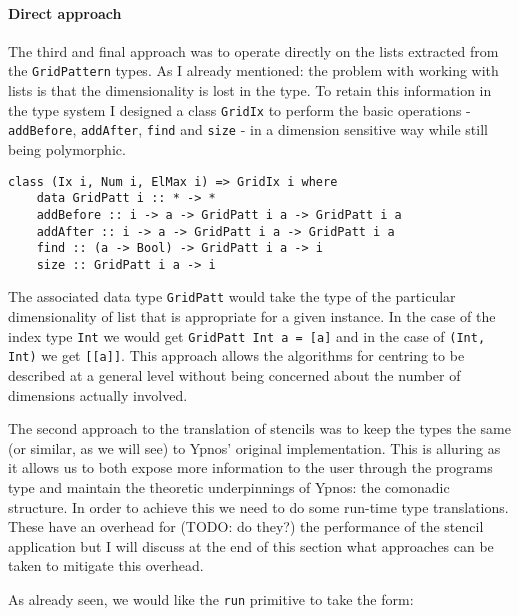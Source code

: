 \paragraph{Direct approach}

The third and final approach was to operate directly on the lists
extracted from the \texttt{GridPattern} types. As I already mentioned:
the problem with working with lists is that the dimensionality is lost
in the type. To retain this information in the type system I designed a
class \texttt{GridIx} to perform the basic operations -
\texttt{addBefore}, \texttt{addAfter}, \texttt{find} and \texttt{size} -
in a dimension sensitive way while still being polymorphic.

\begin{verbatim}
class (Ix i, Num i, ElMax i) => GridIx i where
    data GridPatt i :: * -> *
    addBefore :: i -> a -> GridPatt i a -> GridPatt i a
    addAfter :: i -> a -> GridPatt i a -> GridPatt i a
    find :: (a -> Bool) -> GridPatt i a -> i
    size :: GridPatt i a -> i
\end{verbatim}

The associated data type \texttt{GridPatt} would take the type of the
particular dimensionality of list that is appropriate for a given
instance. In the case of the index type \texttt{Int} we would get
\texttt{GridPatt Int a = {[}a{]}} and in the case of \texttt{(Int, Int)}
we get \texttt{{[}{[}a{]}{]}}. This approach allows the algorithms for
centring to be described at a general level without being concerned
about the number of dimensions actually involved.


The second approach to the translation of stencils was to keep the types
the same (or similar, as we will see) to Ypnos' original implementation.
This is alluring as it allows us to both expose more information to the
user through the programs type and maintain the theoretic underpinnings
of Ypnos: the comonadic structure. In order to achieve this we need to
do some run-time type translations. These have an overhead for (TODO: do
they?) the performance of the stencil application but I will discuss at
the end of this section what approaches can be taken to mitigate this
overhead.

As already seen, we would like the \texttt{run} primitive to take the
form:

